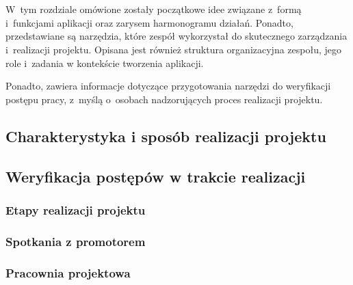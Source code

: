 \chapter{\ChapterTitleWorkOrganization}
\label{sec:organizacja-pracy}

W~tym rozdziale omówione zostały początkowe idee związane z~formą i~funkcjami
aplikacji oraz zarysem harmonogramu działań. Ponadto, przedstawiane
są narzędzia, które zespół wykorzystał do skutecznego zarządzania
i~realizacji projektu. Opisana jest również struktura organizacyjna
zespołu, jego role i~zadania w kontekście tworzenia aplikacji.

Ponadto, zawiera informacje dotyczące przygotowania narzędzi do
weryfikacji postępu pracy, z~myślą o~osobach nadzorujących proces
realizacji projektu.

\section{Charakterystyka i sposób realizacji projektu}


\section{Weryfikacja postępów w trakcie realizacji}

\subsection{Etapy realizacji projektu}

\subsection{Spotkania z promotorem}

\subsection{Pracownia projektowa}


